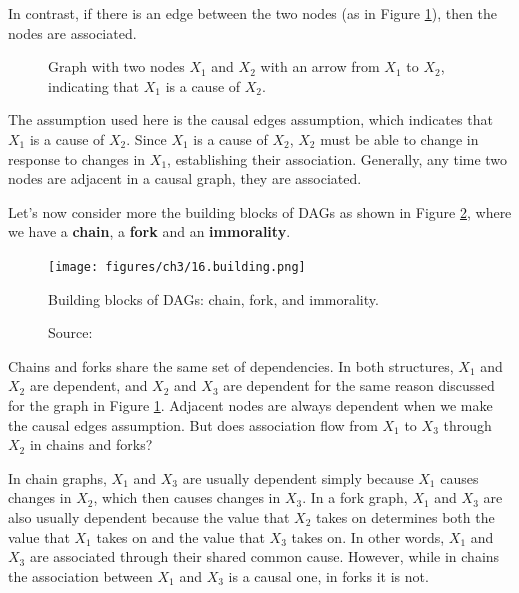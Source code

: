 In contrast, if there is an edge between the two nodes
(as in Figure \ref{fig:connected_nodes}),
then the nodes are associated.
\begin{figure}[h]
    \centering
    \caption{Graph with two nodes \(X_1\) and \(X_2\) with an arrow from \(X_1\) to \(X_2\), indicating that \(X_1\) is a cause of \(X_2\).}
    \label{fig:connected_nodes}
\end{figure}
The assumption used
here is the causal edges assumption, which indicates that
\( X_1 \) is a cause of \( X_2 \). Since \( X_1 \) is a
cause of \( X_2 \), \( X_2 \) must be able to change
in response to changes in \( X_1 \), establishing their
association. Generally, any time two nodes are adjacent
in a causal graph, they are associated.

Let's now consider more the building blocks of DAGs
as shown in Figure
\ref{fig:building}, where we have a
\textbf{chain}, a \textbf{fork} and an \textbf{immorality}.

\begin{figure}[h]
    \centering
    \texttt{[image: figures/ch3/16.building.png]}
    \caption{Building blocks of DAGs: chain, fork, and immorality.}
    \vspace{-10px}
    \caption*{\scriptsize{Source: \cite{Neal_2020a}}}
    \label{fig:building}
\end{figure}

Chains and forks share the same set of dependencies.
In both structures, \(X_1\) and \(X_2\) are dependent,
and \(X_2\) and \(X_3\) are dependent for the same reason discussed
for the graph in Figure \ref{fig:connected_nodes}.
Adjacent nodes are always dependent when we make the causal edges assumption.
But does association flow from \(X_1\) to \(X_3\) through
\(X_2\) in chains and forks?

In chain graphs, \(X_1\) and \(X_3\) are usually dependent simply because
\(X_1\) causes changes in \(X_2\), which then causes changes in \(X_3\).
In a fork graph, \(X_1\) and \(X_3\) are also usually dependent
because the value that \(X_2\) takes on determines both the value that
\(X_1\) takes on and the value that \(X_3\) takes on. In other words,
\(X_1\) and \(X_3\) are associated through their shared common cause.
However, while in chains the association between \(X_1\) and \(X_3\)
is a causal one, in forks it is not.

